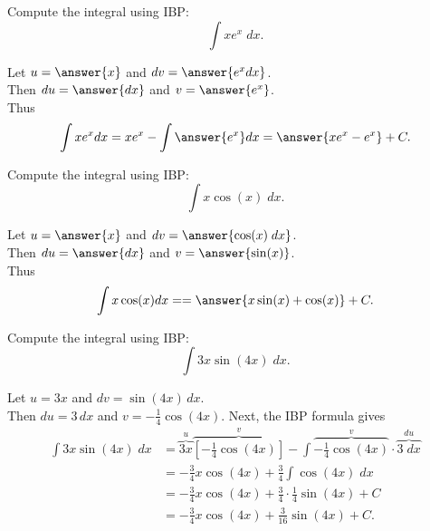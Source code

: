 \documentclass{ximera}
\begin{document}
\begin{problem} %
  Compute the integral using IBP:
  \[
  \int xe^x \;dx.
  \]
  
  Let $u = \answer{x}$   and   $dv = \answer{e^x dx}$.\\
  Then $du = \answer{dx}$   and   $v = \answer{e^x}$.\\
  Thus 
  \[
  \int xe^x dx = xe^x - \int \answer{e^x} dx = \answer{xe^x - e^x} + C.
  \]
  


    

\end{problem}


\begin{problem} %
  Compute the integral using IBP:
  \[
  \int x\cos(x) \;dx.
  \]
  
  Let $u = \answer{x}$   and   $dv = \answer{\cos(x) \;dx}$.\\
  Then $du = \answer{dx}$   and   $v = \answer{\sin(x)}$.\\
  Thus 
  \[
  \int x\cos(x) dx = = \answer{x\sin(x) + \cos(x)} + C.
  \]
  
  


    

\end{problem}


\begin{example}
Compute the integral using IBP:
  \[
  \int 3x\sin(4x) \;dx.
  \]

Let $u = 3x$ and $dv = \sin(4x) \,dx$.\\
Then $du = 3 \,dx$ and $v = -\frac14 \cos(4x)$.
Next, the IBP formula gives
\begin{align*}
  \int 3x\sin(4x) \;dx &= \overbrace{3x}^{u}\overbrace{\left[-\frac14 \cos(4x)\right]}^{v} - \int \overbrace{-\frac14 \cos(4x)}^{v}  \cdot \overbrace{3 \; dx}^{du} \\
                       &= -\frac34 x\cos(4x) + \frac34 \int \cos(4x) \; dx \\
                       &= -\frac34 x\cos(4x) + \frac34 \cdot \frac 14 \sin(4x) + C\\
                       &= -\frac34 x\cos(4x) + \frac{3}{16}\sin(4x) + C.
\end{align*}

\end{example}
\end{document}
